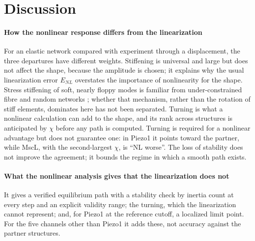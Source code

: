 \documentclass[preprint,12pt,a4paper]{elsarticle}
\begin{document}
\section{Discussion}
\label{sec:disc}
\paragraph{How the nonlinear response differs from the linearization} For an elastic network compared with experiment through a displacement, the three departures have different weights. Stiffening is universal and large but does not affect the shape, because the amplitude is chosen; it explains why the usual linearization error $E_{NL}$ overstates the importance of nonlinearity for the shape. Stress stiffening of soft, nearly floppy modes is familiar from under-constrained fibre and random networks \citep{wyart2008,broedersz2014}; whether that mechanism, rather than the rotation of stiff elements, dominates here has not been separated. Turning is what a nonlinear calculation can add to the shape, and its rank across structures is anticipated by $\chi$ before any path is computed. Turning is required for a nonlinear advantage but does not guarantee one: in Piezo1 it points toward the partner, while MscL, with the second-largest $\chi$, is ``NL worse''. The loss of stability does not improve the agreement; it bounds the regime in which a smooth path exists.

\paragraph{What the nonlinear analysis gives that the linearization does not} It gives a verified equilibrium path with a stability check by inertia count at every step and an explicit validity range; the turning, which the linearization cannot represent; and, for Piezo1 at the reference cutoff, a localized limit point. For the five channels other than Piezo1 it adds these, not accuracy against the partner structures.
\end{document}
